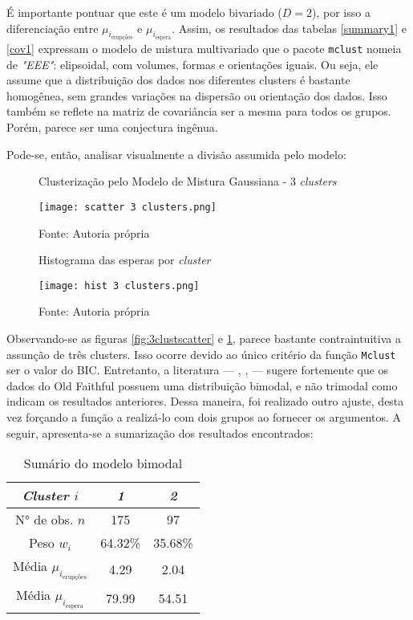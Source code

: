 \documentclass[12pt]{article}
\begin{document}
É importante pontuar que este é um modelo bivariado ($D = 2$), por isso a diferenciação entre $\mu_{i_\text{erupções}}$ e $\mu_{i_\text{espera}}$. Assim, os resultados das tabelas \ref{summary1} e \ref{cov1} expressam o modelo de mistura multivariado que o pacote \texttt{mclust} nomeia de \textit{"EEE"}: elipsoidal, com volumes, formas e orientações iguais. Ou seja, ele assume que a distribuição dos dados nos diferentes clusters é bastante homogênea, sem grandes variações na dispersão ou orientação dos dados. Isso também se reflete na matriz de covariância ser a mesma para todos os grupos. Porém, parece ser uma conjectura ingênua.

Pode-se, então, analisar visualmente a divisão assumida pelo modelo:

\begin{figure}[H]
    \centering
    \begin{minipage}{0.45\textwidth}
        \centering
        \caption{Clusterização pelo Modelo de Mistura Gaussiana - 3 \textit{clusters}}\label{fig:3clustscatter}
        \texttt{[image: scatter 3 clusters.png]}
        \caption*{Fonte: Autoria própria}
    \end{minipage}
    \hfill
    \begin{minipage}{0.45\textwidth}
        \centering
        \caption{Histograma das esperas por \textit{cluster}}\label{fig:3clusthist}
        \texttt{[image: hist 3 clusters.png]}
        \caption*{Fonte: Autoria própria}
    \end{minipage}
\end{figure}

Observando-se as figuras \ref{fig:3clustscatter} e \ref{fig:3clusthist}, parece bastante contraintuitiva a assunção de três clusters. Isso ocorre devido ao único critério da função \texttt{Mclust} ser o valor do BIC. Entretanto, a literatura — \cite{azzalini1990look}, \cite{bryan2008geysers}, \cite{scrucca2016identifying} — sugere fortemente que os dados do Old Faithful possuem uma distribuição bimodal, e não trimodal como indicam os resultados anteriores. Dessa maneira, foi realizado outro ajuste, desta vez forçando a função a realizá-lo com dois grupos ao fornecer os argumentos. A seguir, apresenta-se a sumarização dos resultados encontrados:


\begin{table}[H]
        \centering
        \begin{tabular}{c|cc}
        \hline
        \textit{Cluster $i$} & \textit{1} & \textit{2} \\
        \hline
        N° de obs. $n$ & 175 & 97 \\
        Peso $w_i$  & 64.32\% & 35.68\% \\
        Média $\mu_{i_\text{erupções}}$ & 4.29 & 2.04 \\
        Média $\mu_{i_\text{espera}}$ & 79.99 & 54.51 \\
        \hline
        \end{tabular}
        \caption{Sumário do modelo bimodal}\label{summary2}
\end{table}
\end{document}
